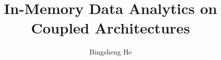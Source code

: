 \documentclass[10pt]{article}
\begin{document}
\title{In-Memory Data Analytics on Coupled Architectures}
\date{}
\author{Bingsheng He}
\maketitle













\end{document}
